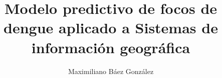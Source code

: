 \documentclass[final,fmstyle]{./util/ucathesis}
\title{Modelo predictivo de focos de dengue aplicado a Sistemas de informaci\'on geogr\'afica}
\author{Maximiliano B\'{a}ez Gonz\'{a}lez}
\begin{document}
\maketitle     %




\tableofcontents
\listoffigures
\listoftables
\listofalgorithms
%
\listofsymbols


\mainmatter  %









\appendix   %
%
\printbibliography
\end{document}

